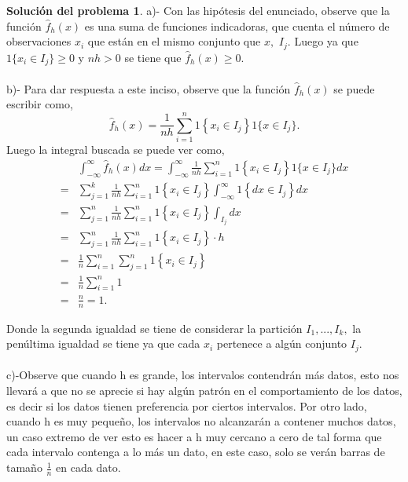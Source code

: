\documentclass[twoside,12pt]{article}
\theoremstyle{definition}
\newtheorem{soln}{Solución del problema}
\begin{document}
\newpage
\begin{soln}
a)- Con las hipótesis del enunciado, observe que la función $\hat{f}_h(x)$ es una suma de funciones indicadoras, que cuenta el número de observaciones $x_i$ que están en el mismo conjunto que $x,$ $I_j.$ Luego ya que $1\{x_i \in I_j\} \geq 0$ y $nh>0$ se tiene que $\hat{f}_h(x)\geq 0.$
    \\ \\ 
    b)- Para dar respuesta a este inciso, observe que la función $\hat{f}_h(x)$ se puede escribir como,
$$ 
\hat{f}_h(x)=\frac{1}{n h} \sum_{i=1}^n 1\left\{x_i \in I_j\right\} 1\{x \in I_j\}.
$$
    Luego la integral buscada se puede ver como,
    $$\begin{aligned} & \int_{-\infty}^{\infty} \hat{f}_h(x) d x=\int_{-\infty}^{\infty} \frac{1}{n h} \sum_{i=1}^n 1\left\{x_i \in I_j\right\} 1\{x \in I_j\} d x \\ = & \sum_{j=1}^k \frac{1}{n h} \sum_{i=1}^n 1\left\{x_i \in I_j\right\} \int_{-\infty}^{\infty} 1\left\{d x \in I_j\right\} d x \\ = & \sum_{j=1}^n \frac{1}{n h} \sum_{i=1}^n 1\left\{x_i \in I_j\right\} \int_{I_j} d x \\ = & \sum_{j=1}^n \frac{1}{n h} \sum_{i=1}^n 1\left\{x_i \in I_j\right\} \cdot h \\ = & \frac{1}{n} \sum_{i=1}^n \sum_{j=1}^n 1\left\{x_i \in I_j\right\} \\ = & \frac{1}{n} \sum_{i=1}^n 1 \\ = & \frac{n}{n}=1.\end{aligned}$$

Donde la segunda igualdad se tiene de considerar la partición $I_1,...,I_k,$ la penúltima igualdad se tiene ya que cada $x_i$ pertenece a algún conjunto $I_j.$
\\ \\
c)-Observe que cuando h es grande, los intervalos contendrán más datos, esto nos llevará a que no se aprecie si hay algún patrón en el comportamiento de los datos, es decir si los datos tienen preferencia por ciertos intervalos. Por otro lado, cuando h es muy pequeño, los intervalos no alcanzarán a contener muchos datos, un caso extremo de ver esto es hacer a h muy cercano a cero de tal forma que cada intervalo contenga a lo más un dato, en este caso, solo se verán barras de tamaño $\frac{1}{n}$ en cada dato.

\end{soln}
\end{document}
